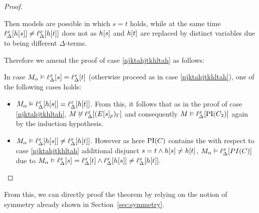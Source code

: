 \begin{proof}
\begin{indproof}
\begin{enumerate}
					Then models are possible in which $s=t$ holds, while at the same time $\ell_{\Delta}^{x}[h[s]] \neq \ell_{\Delta}^{x}[h[t]]$ does not as $h[s]$ and $h[t]$ are replaced by distinct variables due to being different $\Delta$-terms.

					Therefore we amend the proof of case \ref{njktahjtkhltah} as follows:

					In case $M_\alpha \vDash \ell_{\Delta}^{x}[s] = \ell_{\Delta}^{x}[t]$ (otherwise proceed as in case \ref{njktahjtkhltah}), 
					one of the following cases holds:

					\begin{itemize}
					\item $M_\alpha\vDash \ell_{\Delta}^{x}[h[s]] = \ell_{\Delta}^{x}[h[t]]$. From this, it follows that as in the proof of case \ref{njktahjtkhltah}, $M \not\vDash \ell_{\Delta}^{x}[(E{[s]_{p}})_\Gamma]$ and consequently $M \vDash \ell_{\Delta}^{x}[\operatorname{PI}(C_2)]$ again by the induction hypothesis.

					\item 
						$M_\alpha \vDash \ell_{\Delta}^{x}[h[s]] \neq \ell_{\Delta}^{x}[h[t]]$.
						However as here $\operatorname{PI}(C)$ contains the with respect to case \ref{njktahjtkhltah} additional disjunct $s=t \land h[s] \neq h[t]$,
						$M_\alpha \vDash \ell_{\Delta}^{x}[PI(C)]$ due to $M_\alpha \vDash \ell_{\Delta}^{x}[s]=\ell_{\Delta}^{x}[t] \land \ell_{\Delta}^{x}[h[s]] \neq \ell_{\Delta}^{x}[h[t]].$
					\qedhere
					\end{itemize}
			\end{enumerate}

	\end{indproof}
\end{proof}

From this, we can directly proof the theorem by relying on the notion of symmetry already shown in Section~\ref{sec:symmetry}.

